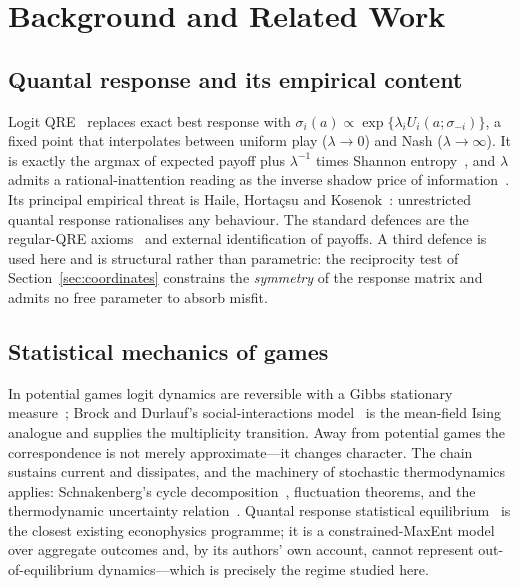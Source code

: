 \section{Background and Related Work}
\label{sec:background}

\subsection{Quantal response and its empirical content}
Logit QRE~\cite{mckelvey1995} replaces exact best response with
$\sigma_i(a)\propto\exp\{\lambda_i U_i(a;\sigma_{-i})\}$, a fixed point that interpolates
between uniform play ($\lambda\to0$) and Nash ($\lambda\to\infty$). It is exactly the
argmax of expected payoff plus $\lambda^{-1}$ times Shannon
entropy~\cite{fudenberg2015}, and $\lambda$ admits a rational-inattention reading as the
inverse shadow price of information~\cite{matejka2015}. Its principal empirical threat is
Haile, Horta\c{c}su and Kosenok~\cite{haile2008}: unrestricted quantal response rationalises
any behaviour. The standard defences are the regular-QRE axioms~\cite{goeree2016} and
external identification of payoffs. A third defence is used here and is structural rather
than parametric: the reciprocity test of Section~\ref{sec:coordinates} constrains the
\emph{symmetry} of the response matrix and admits no free parameter to absorb misfit.

\subsection{Statistical mechanics of games}
In potential games logit dynamics are reversible with a Gibbs stationary
measure~\cite{blume1993,monderer1996}; Brock and Durlauf's social-interactions
model~\cite{brock2001} is the mean-field Ising analogue and supplies the multiplicity
transition. Away from potential games the correspondence is not merely approximate---it
changes character. The chain sustains current and dissipates, and the machinery of
stochastic thermodynamics applies: Schnakenberg's cycle decomposition~\cite{schnakenberg1976},
fluctuation theorems, and the thermodynamic uncertainty relation~\cite{barato2015,seifert2012}.
Quantal response statistical equilibrium~\cite{scharfenaker2017} is the closest existing
econophysics programme; it is a constrained-MaxEnt model over aggregate outcomes and, by its
authors' own account, cannot represent out-of-equilibrium dynamics---which is precisely the
regime studied here.

